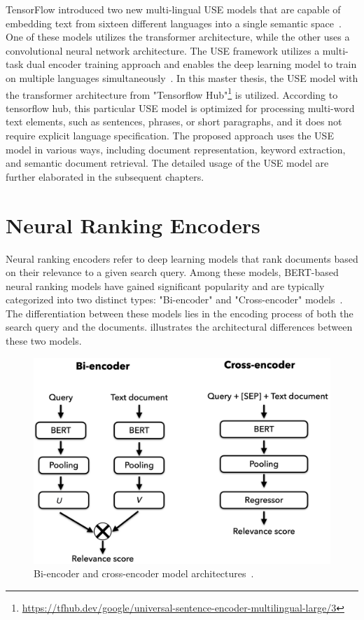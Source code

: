 \begin{description}
	TensorFlow introduced two new multi-lingual \ac{USE} models that are capable of embedding text from sixteen different languages into a single semantic space~\cite{yang2019multilingual}. One of these models utilizes the transformer architecture, while the other uses a convolutional neural network architecture. The \ac{USE} framework utilizes a multi-task dual encoder training approach and enables the deep learning model to train on multiple languages simultaneously~\cite{yang2019multilingual}. In this master thesis, the \ac{USE} model with the transformer architecture from "Tensorflow Hub"\footnote{\url{https://tfhub.dev/google/universal-sentence-encoder-multilingual-large/3}} is utilized. According to tensorflow hub, this particular \ac{USE} model is optimized for processing multi-word text elements, such as sentences, phrases, or short paragraphs, and it does not require explicit language specification. The proposed approach uses the \ac{USE} model in various ways, including document representation, keyword extraction, and semantic document retrieval. The detailed usage of the \ac{USE} model are further elaborated in the subsequent chapters.

	
\end{description}

\section{Neural Ranking Encoders}

Neural ranking encoders refer to deep learning models that rank documents based on their relevance to a given search query. Among these models, BERT-based neural ranking models have gained significant popularity and are typically categorized into two distinct types: "Bi-encoder" and "Cross-encoder" models~\cite{choi2021improving, jung2022semi, ishihara2022nikkei}. The differentiation between these models lies in the encoding process of both the search query and the documents.  illustrates the architectural differences between these two models.

\begin{figure}[h]
	\centering
	\includegraphics[width=.8\textwidth]{images/thesis_images/neural_ranking_models.png}
	\caption{Bi-encoder and cross-encoder model architectures~\cite{ ishihara2022nikkei}. \label{fig:neural_reranker}}
\end{figure}

